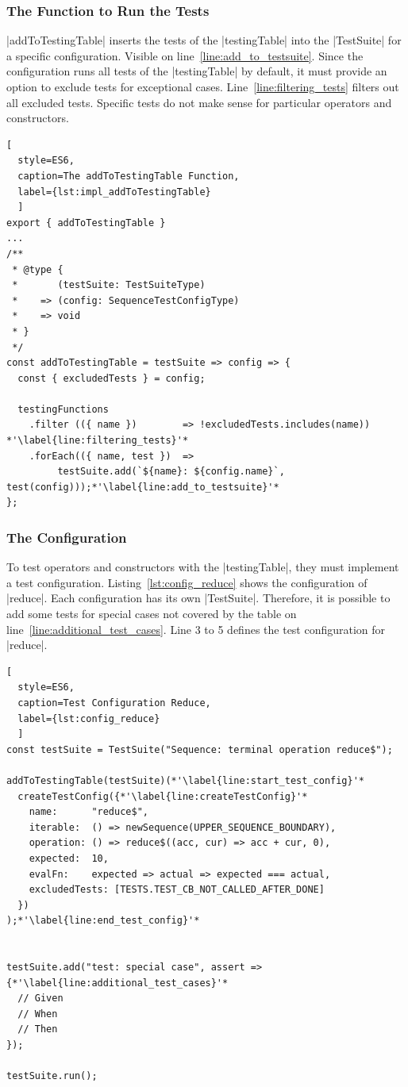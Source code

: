 \subsubsection{The Function to Run the Tests}
\label{subsub:The Function to Run the Tests}
|addToTestingTable| inserts the tests of the |testingTable| into the |TestSuite| for a
specific configuration. Visible on line~\ref{line:add_to_testsuite}. 
Since the configuration runs all tests of the |testingTable| by default, it
must provide an option to exclude tests for exceptional cases. 
Line~\ref{line:filtering_tests} filters out all excluded tests.
Specific tests do not make sense for particular operators and constructors.

\begin{lstlisting}[
  style=ES6, 
  caption=The addToTestingTable Function,
  label={lst:impl_addToTestingTable}
  ]
export { addToTestingTable }
...
/**
 * @type {
 *       (testSuite: TestSuiteType)
 *    => (config: SequenceTestConfigType)
 *    => void
 * }
 */
const addToTestingTable = testSuite => config => {
  const { excludedTests } = config;

  testingFunctions
    .filter (({ name })        => !excludedTests.includes(name)) *'\label{line:filtering_tests}'*
    .forEach(({ name, test })  => 
         testSuite.add(`${name}: ${config.name}`, test(config)));*'\label{line:add_to_testsuite}'*
};
\end{lstlisting}

\subsubsection{The Configuration}
\label{subsub:The Configuration}

To test operators and constructors with the |testingTable|, they must implement 
a test configuration.
Listing~\ref{lst:config_reduce} shows the configuration of |reduce|. 
Each configuration has its own |TestSuite|. Therefore, it is possible to add
some tests for special cases not covered by the table on line~\ref{line:additional_test_cases}.
Line 3 to 5 defines the test configuration for |reduce|. 

\begin{lstlisting}[
  style=ES6, 
  caption=Test Configuration Reduce,
  label={lst:config_reduce}
  ]
const testSuite = TestSuite("Sequence: terminal operation reduce$");

addToTestingTable(testSuite)(*'\label{line:start_test_config}'*
  createTestConfig({*'\label{line:createTestConfig}'*
    name:      "reduce$",
    iterable:  () => newSequence(UPPER_SEQUENCE_BOUNDARY),
    operation: () => reduce$((acc, cur) => acc + cur, 0),
    expected:  10,
    evalFn:    expected => actual => expected === actual,
    excludedTests: [TESTS.TEST_CB_NOT_CALLED_AFTER_DONE]
  })
);*'\label{line:end_test_config}'*


testSuite.add("test: special case", assert =>
{*'\label{line:additional_test_cases}'*
  // Given
  // When
  // Then
});

testSuite.run();
\end{lstlisting}

